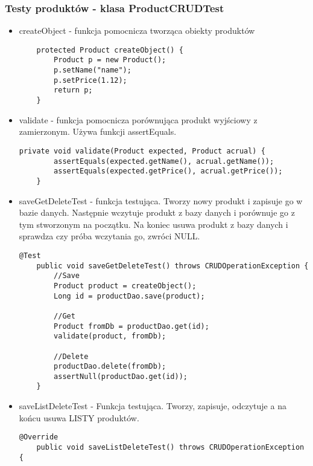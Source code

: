 \documentclass[a4paper,11pt,notitlepage]{article}
\begin{document}
\subsubsection{Testy produktów - klasa ProductCRUDTest}
\begin{itemize}
    \item createObject - funkcja pomocnicza tworząca obiekty produktów
    \begin{footnotesize}\begin{verbatim}
    protected Product createObject() {
        Product p = new Product();
        p.setName("name");
        p.setPrice(1.12);
        return p;
    }
\end{verbatim}\end{footnotesize}
    
    
    \item validate - funkcja pomocnicza porównująca produkt wyjściowy z zamierzonym. Używa funkcji assertEquals.
    \begin{footnotesize}\begin{verbatim}
private void validate(Product expected, Product acrual) {
        assertEquals(expected.getName(), acrual.getName());
        assertEquals(expected.getPrice(), acrual.getPrice());
    }
\end{verbatim}\end{footnotesize}
    
  \item saveGetDeleteTest - funkcja testująca. Tworzy nowy produkt i zapisuje go w bazie danych. Następnie wczytuje produkt z bazy danych i porównuje go z tym stworzonym na początku. Na koniec usuwa produkt z bazy danych i sprawdza czy próba wczytania go, zwróci NULL.
  \begin{footnotesize}\begin{verbatim}
@Test
    public void saveGetDeleteTest() throws CRUDOperationException {
        //Save
        Product product = createObject();
        Long id = productDao.save(product);

        //Get
        Product fromDb = productDao.get(id);
        validate(product, fromDb);

        //Delete
        productDao.delete(fromDb);
        assertNull(productDao.get(id));
    }
\end{verbatim}\end{footnotesize}
\item saveListDeleteTest - Funkcja testująca. Tworzy, zapisuje, odczytuje a na końcu usuwa LISTY produktów.
\begin{footnotesize}\begin{verbatim}
@Override
    public void saveListDeleteTest() throws CRUDOperationException {


\end{verbatim}
\end{footnotesize}
\end{itemize}
\end{document}
